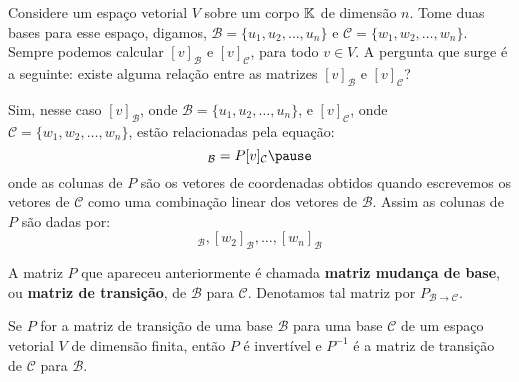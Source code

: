 \documentclass{beamer}
\begin{document}
\begin{frame}
    Considere um espaço vetorial $V$ \pause sobre um corpo $\mathbb{K}$ \pause de dimensão $n$. \pause Tome duas bases para esse espaço, \pause digamos, $\mathcal{B} = \{u_1, u_2, \dots, u_n\}$ \pause e $\mathcal{C} = \{w_1, w_2, \dots, w_n\}$. \pause Sempre podemos calcular $[v]_\mathcal{B}$ \pause e $[v]_\mathcal{C}$, \pause para todo $v \in V$. \pause A pergunta que surge é a seguinte: \pause existe alguma relação entre as matrizes $[v]_\mathcal{B}$ e $[v]_\mathcal{C}$?
\end{frame}

\begin{frame}
    Sim, nesse caso $[v]_\mathcal{B}$, onde $\mathcal{B} = \{u_1, u_2, \dots, u_n\}$, e $[v]_\mathcal{C}$, onde $\mathcal{C} = \{w_1, w_2, \dots, w_n\}$, estão relacionadas pela equação:
    \begin{equation}
        [v]_\mathcal{B} = P[v]_\mathcal{C}\pause
    \end{equation}
    onde as colunas de $P$ são os vetores de coordenadas obtidos quando escrevemos os vetores de $\mathcal{C}$ como uma combinação linear dos vetores de $\mathcal{B}$. Assim as colunas de $P$ são dadas por:
    \begin{equation}
        [w_1]_\mathcal{B}, [w_2]_\mathcal{B}, \dots, [w_n]_\mathcal{B}
    \end{equation}
\end{frame}

\begin{frame}
    \begin{definicao}
        A matriz $P$ que apareceu anteriormente é chamada \textbf{matriz mudança de base}, ou \textbf{matriz de transição}, de $\mathcal{B}$ para $\mathcal{C}$. Denotamos tal matriz por $P_{\mathcal{B} \to \mathcal{C}}$.
    \end{definicao}
\end{frame}

\begin{frame}
    \begin{teorema}
        Se $P$ for a matriz de transição de uma base $\mathcal{B}$ para uma base $\mathcal{C}$ de um espaço vetorial $V$ de dimensão finita, então $P$ é invertível e $P^{-1}$ é a matriz de transição de $\mathcal{C}$ para $\mathcal{B}$.
    \end{teorema}
\end{frame}
\end{document}
